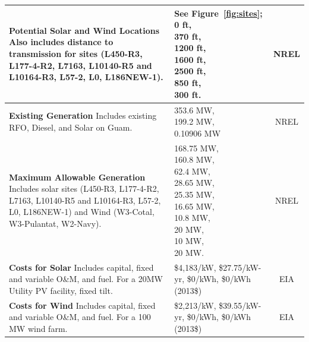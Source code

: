 \documentclass[12pt,letterpaper,fleqn]{article}
\makeatletter
\newcommand{\spc}[2][l]{%
  \begin{tabular}[#1]{@{}l@{}}#2\end{tabular}}
\makeatother
\begin{document}
\begin{center}
\begin{longtable}{| p{11cm} | p{3cm} | c | }
    \textbf{Potential Solar and Wind Locations} Also includes distance
    to transmission for sites (L450-R3, L177-4-R2, L7163, L10140-R5
    and L10164-R3, L57-2, L0, L186NEW-1). 
    & \spc{See Figure~\ref{fig:sites};\\0 ft,\\370 ft,\\1200 ft,\\1600
    ft,\\2500 ft,\\850 ft,\\300 ft.}
    & NREL \cite{misty} 
    \\\hline

    \textbf{Existing Generation} Includes existing RFO, Diesel, and
    Solar on Guam. 
    & \spc{353.6 MW,\\199.2 MW,\\0.10906 MW}
    & NREL \cite{misty} 
    \\\hline

    \textbf{Maximum Allowable Generation} Includes solar sites
    (L450-R3, L177-4-R2, L7163, L10140-R5 and L10164-R3, L57-2, L0,
    L186NEW-1) and Wind (W3-Cotal, W3-Pulantat, W2-Navy). 
    & \spc{168.75 MW,\\160.8 MW,\\62.4 MW,\\28.65 MW,\\25.35
      MW,\\16.65 MW,\\10.8 MW,\\20 MW,\\10 MW,\\20 MW.}
    & NREL \cite{misty} 
    \\\hline

    \textbf{Costs for Solar} Includes capital, fixed and variable
    O\&M, and fuel. For a 20MW Utility PV facility, fixed tilt. 
    & \spc{\$4,183/kW,\\\$27.75/kW-yr,\\\$0/kWh,\\\$0/kWh\\(2013\$)}
    & EIA \cite{eia13} 
    \\\hline

    \textbf{Costs for Wind} Includes capital, fixed and variable O\&M,
    and fuel. For a 100 MW wind farm. 
    & \spc{\$2,213/kW,\\\$39.55/kW-yr,\\\$0/kWh,\\\$0/kWh\\(2013\$)}
    & EIA \cite{eia13} 
    \\\hline


\end{longtable}
\end{center}
\end{document}
